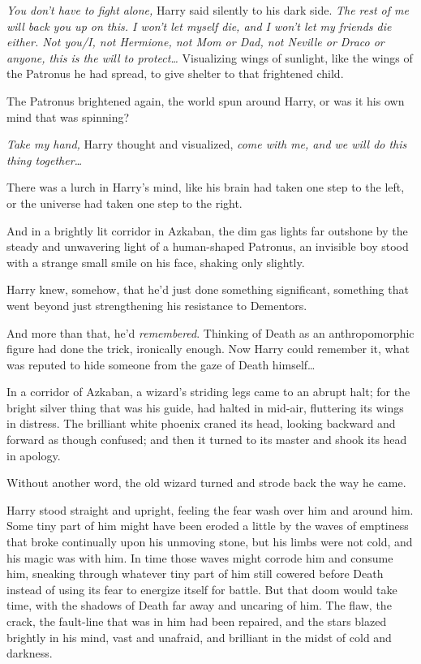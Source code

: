 \emph{You don't have to fight alone,} Harry said silently to his dark side. \emph{The rest of me will back you up on this. I won't let myself die, and I won't let my friends die either. Not you/I, not Hermione, not Mom or Dad, not Neville or Draco or anyone, this is the will to protect{\ldots}} Visualizing wings of sunlight, like the wings of the Patronus he had spread, to give shelter to that frightened child.

The Patronus brightened again, the world spun around Harry, or was it his own mind that was spinning?

\emph{Take my hand,} Harry thought and visualized, \emph{come with me, and we will do this thing together{\ldots}}

There was a lurch in Harry's mind, like his brain had taken one step to the left, or the universe had taken one step to the right.

And in a brightly lit corridor in Azkaban, the dim gas lights far outshone by the steady and unwavering light of a human-shaped Patronus, an invisible boy stood with a strange small smile on his face, shaking only slightly.

Harry knew, somehow, that he'd just done something significant, something that went beyond just strengthening his resistance to Dementors.

And more than that, he'd \emph{remembered}. Thinking of Death as an anthropomorphic figure had done the trick, ironically enough. Now Harry could remember it, what was reputed to hide someone from the gaze of Death himself{\ldots}

\later

In a corridor of Azkaban, a wizard's striding legs came to an abrupt halt; for the bright silver thing that was his guide, had halted in mid-air, fluttering its wings in distress. The brilliant white phoenix craned its head, looking backward and forward as though confused; and then it turned to its master and shook its head in apology.

Without another word, the old wizard turned and strode back the way he came.

\later

Harry stood straight and upright, feeling the fear wash over him and around him. Some tiny part of him might have been eroded a little by the waves of emptiness that broke continually upon his unmoving stone, but his limbs were not cold, and his magic was with him. In time those waves might corrode him and consume him, sneaking through whatever tiny part of him still cowered before Death instead of using its fear to energize itself for battle. But that doom would take time, with the shadows of Death far away and uncaring of him. The flaw, the crack, the fault-line that was in him had been repaired, and the stars blazed brightly in his mind, vast and unafraid, and brilliant in the midst of cold and darkness.

